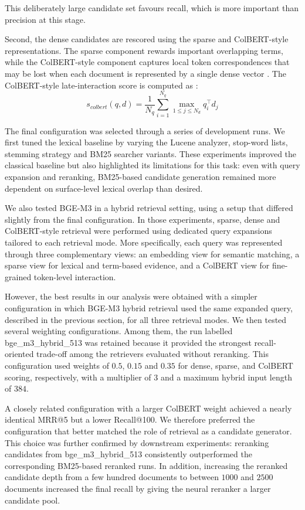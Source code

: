 This deliberately large candidate set favours recall, which is more important than precision at this stage.

Second, the dense candidates are rescored using the sparse and ColBERT-style representations. The sparse component rewards important overlapping terms, while the ColBERT-style component captures local token correspondences that may be lost when each document is represented by a single dense vector \cite{khattab2020colbert}.
The ColBERT-style late-interaction score is computed as \cite{khattab2020colbert}:
\[
    s_{colbert}(q,d)=\frac{1}{N_q}\sum_{i=1}^{N_q}\max_{1\le j\le N_d} q_i^\top d_j
\]

The final configuration was selected through a series of development runs. We first tuned the lexical baseline by varying the Lucene analyzer, stop-word lists, stemming strategy and BM25 searcher variants. These experiments improved the classical baseline but also highlighted its limitations for this task: even with query expansion and reranking, BM25-based candidate generation remained more dependent on surface-level lexical overlap than desired.

We also tested BGE-M3 in a hybrid retrieval setting, using a setup that differed slightly from the final configuration. In those experiments, sparse, dense and ColBERT-style retrieval were performed using dedicated query expansions tailored to each retrieval mode. More specifically, each query was represented through three complementary views: an embedding view for semantic matching, a sparse view for lexical and term-based evidence, and a ColBERT view for fine-grained token-level interaction.

However, the best results in our analysis were obtained with a simpler configuration in which BGE-M3 hybrid retrieval used the same expanded query, described in the previous section, for all three retrieval modes. We then tested several weighting configurations. Among them, the run labelled bge\_m3\_hybrid\_513 was retained because it provided the strongest recall-oriented trade-off among the retrievers evaluated without reranking. This configuration used weights of $0.5$, $0.15$ and $0.35$ for dense, sparse, and ColBERT scoring, respectively, with a multiplier of $3$ and a maximum hybrid input length of $384$.

A closely related configuration with a larger ColBERT weight achieved a nearly identical MRR@5 but a lower Recall@100. We therefore preferred the configuration that better matched the role of retrieval as a candidate generator. This choice was further confirmed by downstream experiments: reranking candidates from bge\_m3\_hybrid\_513 consistently outperformed the corresponding BM25-based reranked runs. In addition, increasing the reranked candidate depth from a few hundred documents to between $1000$ and $2500$ documents increased the final recall by giving the neural reranker a larger candidate pool.

